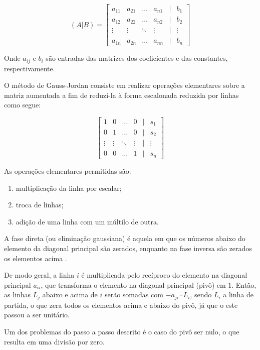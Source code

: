 \documentclass[twocolumn, 10pt]{extarticle}
\begin{document}
\[ 
(A\vert B) = 
\begin{bmatrix}
a_{11} & a_{21} & \dots & a_{n1} & \vert & b_1 \\
a_{12} & a_{22} & \dots & a_{n2} & \vert & b_2 \\
\vdots & \vdots & \ddots & \vdots & \vert & \vdots \\
a_{1n} & a_{2n} & \dots & a_{nn} & \vert & b_n

\end{bmatrix}
\]

Onde $a_{ij}$ e $b_i$ são entradas das matrizes dos coeficientes e das constantes, respectivamente.

O método de Gauss-Jordan consiste em realizar operações elementares sobre a matriz aumentada a fim de reduzi-la à forma escalonada reduzida por linhas \cite[p. 15]{antonAlgebra} como segue:

\[ 
\begin{bmatrix}
1 & 0 & \dots & 0 & \vert & s_1 \\
0 & 1 & \dots & 0 & \vert & s_2 \\
\vdots & \vdots & \ddots & \vdots & \vert & \vdots \\
0 & 0 & \dots & 1 & \vert & s_n
\end{bmatrix}
\]

As operações elementares permitidas são:

\begin{enumerate}
    \item multiplicação da linha por escalar;
    \item troca de linhas;
    \item adição de uma linha com um múltilo de outra.
\end{enumerate}

A fase direta (ou eliminação gaussiana) é aquela em que os números abaixo do elemento da diagonal principal são zerados, enquanto na fase inversa são zerados os elementos acima \cite[p.15]{antonAlgebra}.

De modo geral, a linha $i$ é multiplicada pelo recíproco do elemento na diagonal principal $a_{ii}$, que transforma o elemento na diagonal principal (pivô) em $1$. Então, as linhas $L_j$ abaixo e acima de $i$ serão somadas com $-a_{ji}\cdot L_i$, sendo $L_i$ a linha de partida, o que zera todos os elementos acima e abaixo do pivô, já que o este passou a ser unitário.

Um dos problemas do passo a passo descrito é o caso do pivô ser nulo, o que resulta em uma divisão por zero. 
\end{document}
